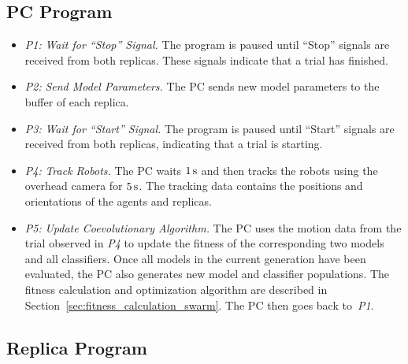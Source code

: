\subsection{PC Program}

\begin{itemize}
	\item \textit{P1:} \textit{Wait for ``Stop'' Signal.} The program is paused until ``Stop'' signals are received from both replicas. These signals indicate that a trial has finished.
	
	\item \textit{P2:} \textit{Send Model Parameters.} The PC sends new model parameters to the buffer of each replica. %
	
	\item \textit{P3:} \textit{Wait for ``Start'' Signal.} The program is paused until ``Start'' signals are received from both replicas, indicating that a trial is starting.
	
	\item \textit{P4:} \textit{Track Robots.} The PC waits $\unit[1]{s}$ and then tracks the robots using the overhead camera for $\unit[5]{s}$. The tracking data contains the positions and orientations of the agents and replicas. 
	
	\item \textit{P5:} \textit{Update Coevolutionary Algorithm.} The PC uses the motion data from the trial observed in \textit{P4} to update the fitness of the corresponding two models and all classifiers. Once all models in the current generation have been evaluated, the PC also generates new model and classifier populations. The fitness calculation and optimization algorithm are described in Section~\ref{sec:fitness_calculation_swarm}. The PC then goes back to~\textit{P1}. 
\end{itemize}

\subsection{Replica Program}\label{sec:replica_program_physical_swarm}

